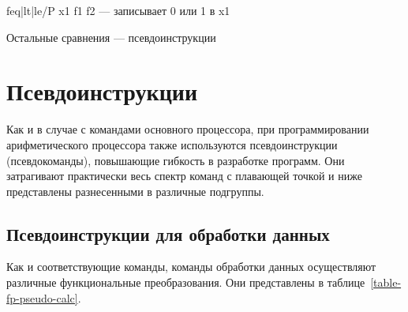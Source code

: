 f{eq|lt|le}/P x1 f1 f2 — записывает 0 или 1 в x1

Остальные сравнения --- псевдоинструкции


\section{Псевдоинструкции}


Как и в случае с командами основного процессора, при программировании арифметического процессора также используются псевдоинструкции (псевдокоманды), повышающие гибкость в разработке программ. Они затрагивают практически весь спектр команд с плавающей точкой и ниже представлены разнесенными в различные подгруппы.

\subsection{Псевдоинструкции для обработки данных}

Как и соответствующие команды, команды обработки данных осуществляют различные функциональные преобразования. Они представлены в таблице~\ref{table-fp-pseudo-calc}.


